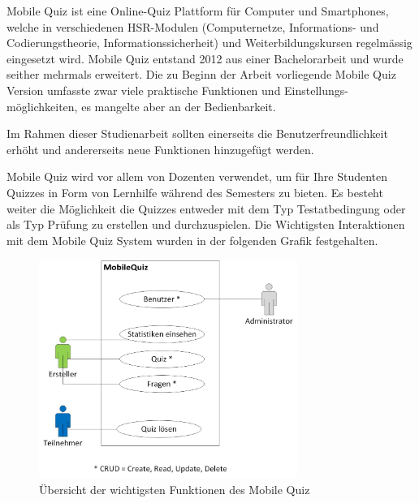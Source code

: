 
Mobile Quiz ist eine Online-Quiz Plattform für Computer und Smartphones, welche in verschiedenen HSR-Modulen (Computernetze, Informations- und Codierungstheorie, Informationssicherheit) und Weiterbildungskursen regelmässig eingesetzt wird. Mobile Quiz entstand 2012 aus einer Bachelorarbeit und wurde seither mehrmals erweitert. Die zu Beginn der Arbeit vorliegende Mobile Quiz Version umfasste zwar viele praktische Funktionen und Einstellungs-möglichkeiten, es mangelte aber an der Bedienbarkeit.

\bigskip

Im Rahmen dieser Studienarbeit sollten einerseits die Benutzerfreundlichkeit erhöht und andererseits neue Funktionen hinzugefügt werden.

\bigskip

Mobile Quiz wird vor allem von Dozenten verwendet, um für Ihre Studenten Quizzes in Form von Lernhilfe während des Semesters zu bieten. Es besteht weiter die Möglichkeit die Quizzes entweder mit dem Typ Testatbedingung oder als Typ Prüfung zu erstellen und durchzuspielen. Die Wichtigsten Interaktionen mit dem Mobile Quiz System wurden in der folgenden Grafik festgehalten.
\begin{figure}[H]
	\centering
	\includegraphics[width=0.75\textwidth]
	{Images/MobileQuiz_Uebersicht.PNG}
	\caption{Übersicht der wichtigsten Funktionen des Mobile Quiz}
\end{figure}

\bigskip


